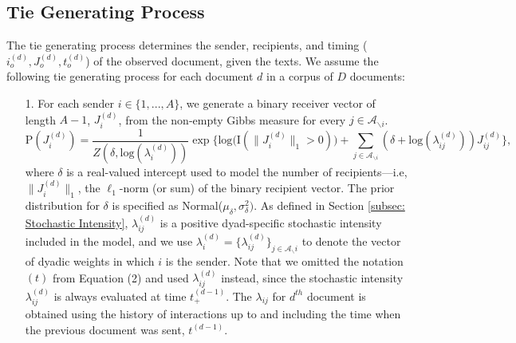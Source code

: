 \documentclass[a4paper]{article}
\begin{document}
\subsection{Tie Generating Process}\label{subsec: Tie Generating Process} 
The tie generating process determines the sender, recipients, and timing ($i_o^{(d)}, J_o^{(d)}, t_o^{(d)}$) of the observed document, given the texts. We assume the following tie generating process for each document $d$ in a corpus of $D$ documents:
\begin{itemize} 
	\item[1.] For each sender $i \in \{1,...,A\}$, we generate a binary receiver vector of length $A-1$, $J^{(d)}_i$, from the non-empty Gibbs measure \citep{fellows2017removing} for every $j \in \mathcal{A}_{\backslash i}$. 
%
	\begin{equation} \text{P}(J_i^{(d)}) = \frac{1}{Z(\delta,\mbox{log}(\lambda_i^{(d)}))} \exp\Big\{ \mbox{log}\big(\text{I}( \lVert J_i^{(d)} \rVert_1 > 0 )\big) + \sum_{j \in \mathcal{A}_{\backslash i}} (\delta+\mbox{log}(\lambda_{ij}^{(d)}))J_{ij}^{(d)} \Big\},
		\label{alg:gibbsmeasure}
		\end{equation}
% 
	where $\delta$ is a real-valued intercept used to model the number of recipients---i.e, $\lVert J_{i}^{(d)} \rVert_1$, the $\ell_1$-norm (or sum) of the binary recipient vector. The prior distribution for $\delta$ is specified as Normal($\mu_\delta, \sigma^2_\delta)$. As defined in Section \ref{subsec: Stochastic Intensity}, $\lambda_{ij}^{(d)}$ is a positive dyad-specific stochastic intensity included in the model, and we use $\lambda_{i}^{(d)}=\{\lambda_{ij}^{(d)}\}_{j\in \mathcal{A}_\backslash i}$ to denote the vector of dyadic weights in which $i$ is the sender. Note that we omitted the notation $(t)$ from Equation (2) and used $\lambda_{ij}^{(d)}$ instead, since the stochastic intensity $\lambda_{ij}^{(d)}$ is always evaluated at time $t_+^{(d-1)}$. The $\lambda_{ij}$ for $d^{th}$ document is obtained using the history of interactions up to and including the time when the previous document was sent, $t^{(d-1)}$. 
	

\end{itemize}
\end{document}
